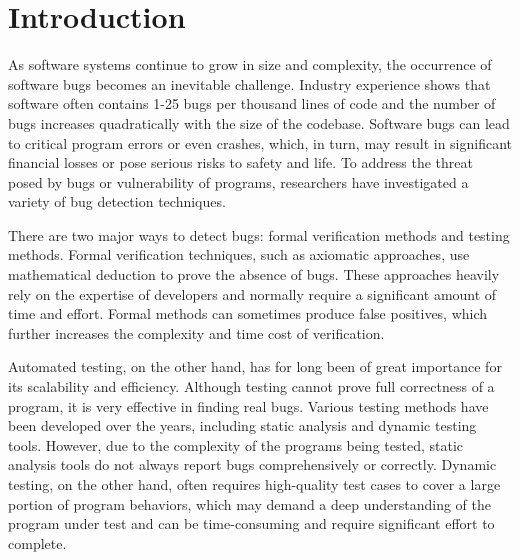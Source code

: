 \chapter{\label{cha:intro}Introduction}

\listoftodos{}

As software systems continue to grow in size and complexity, the occurrence of software bugs becomes an inevitable challenge. Industry experience shows that software often contains 1-25 bugs per thousand lines of code\cite{code-complete} and the number of bugs increases quadratically with the size of the codebase\cite{month}. Software bugs can lead to critical program errors or even crashes, which, in turn, may result in significant financial losses\cite{bug4} or pose serious risks to safety and life\cite{bug1, bug2, bug3}. To address the threat posed by bugs or vulnerability of programs, researchers have investigated a variety of bug detection techniques. 

There are two major ways to detect bugs: formal verification methods and testing methods. Formal verification techniques, such as axiomatic approaches, use mathematical deduction to prove the absence of bugs. These approaches heavily rely on the expertise of developers and normally require a significant amount of time and effort\cite{sel4}. Formal methods can sometimes produce false positives, which further increases the complexity and time cost of verification.


Automated testing, on the other hand, has for long been of great importance for its scalability and efficiency. Although testing cannot prove full correctness of a program, it is very effective in finding real bugs. Various testing methods have been developed over the years, including static analysis\cite{infer, RacerD} and dynamic testing tools\cite{ASAN, TSAN}. However, due to the complexity of the programs being tested, static analysis tools do not always report bugs comprehensively or correctly. Dynamic testing, on the other hand, often requires high-quality test cases to cover a large portion of program behaviors, which may demand a deep understanding of the program under test and can be time-consuming and require significant effort to complete.


